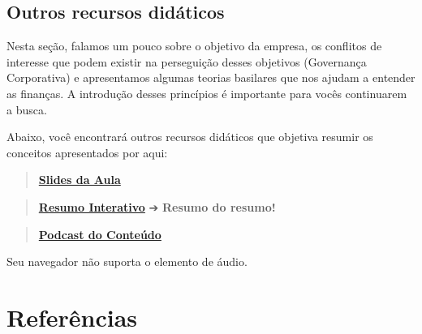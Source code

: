 \documentclass[
  a4paper,
]{book}
\begin{document}
\section*{Outros recursos
didáticos}\label{outros-recursos-diduxe1ticos-1}


Nesta seção, falamos um pouco sobre o objetivo da empresa, os conflitos
de interesse que podem existir na perseguição desses objetivos
(Governança Corporativa) e apresentamos algumas teorias basilares que
nos ajudam a entender as finanças. A introdução desses princípios é
importante para vocês continuarem a busca.

Abaixo, você encontrará outros recursos didáticos que objetiva resumir
os conceitos apresentados por aqui:

\begin{quote}
\href{./resources/teorias-ppt.html}{\textbf{Slides da Aula}}
\end{quote}

\begin{quote}
\href{./resources/teorias-interativo.html}{\textbf{Resumo Interativo}} ➔
\textbf{Resumo do resumo!} 🥱
\end{quote}

\begin{quote}
\href{resources/teoria-podcast.mp3}{\textbf{Podcast do Conteúdo}}
\end{quote}

Seu navegador não suporta o elemento de áudio.


\chapter*{Referências}\label{referuxeancias}

\end{document}
